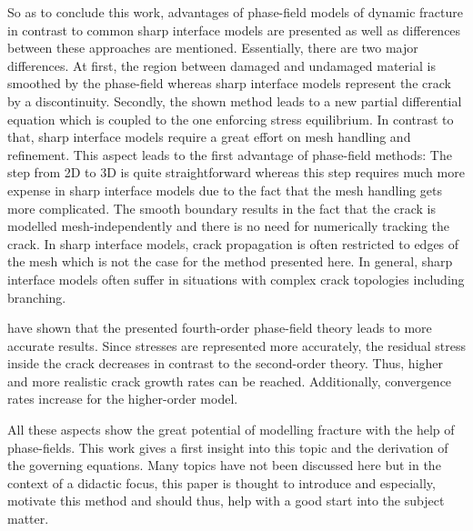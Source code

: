 So as to conclude this work, advantages of phase-field models of dynamic fracture in contrast to common sharp interface models are presented as well as differences between these approaches are mentioned. Essentially, there are two major differences. At first, the region between damaged and undamaged material is smoothed by the phase-field whereas sharp interface models represent the crack by a discontinuity. Secondly, the shown method leads to a new partial differential equation which is coupled to the one enforcing stress equilibrium. In contrast to that, sharp interface models require a great effort on mesh handling and refinement. This aspect leads to the first advantage of phase-field methods: The step from 2D to 3D is quite straightforward whereas this step requires much more expense in sharp interface models due to the fact that the mesh handling gets more complicated. The smooth boundary results in the fact that the crack is modelled mesh-independently and there is no need for numerically tracking the crack. In sharp interface models, crack propagation is often restricted to edges of the mesh which is not the case for the method presented here. In general, sharp interface models often suffer in situations with complex crack topologies including branching. 

\citet{02_PF_HO_brittle} have shown that the presented fourth-order phase-field theory leads to more accurate results. Since stresses are represented more accurately, the residual stress inside the crack decreases in contrast to the second-order theory. Thus, higher and more realistic crack growth rates can be reached. Additionally, convergence rates increase for the higher-order model.

All these aspects show the great potential of modelling fracture with the help of phase-fields. This work gives a first insight into this topic and the derivation of the governing equations. Many topics have not been discussed here but in the context of a didactic focus, this paper is thought to introduce and especially, motivate this method and should thus, help with a good start into the subject matter.

